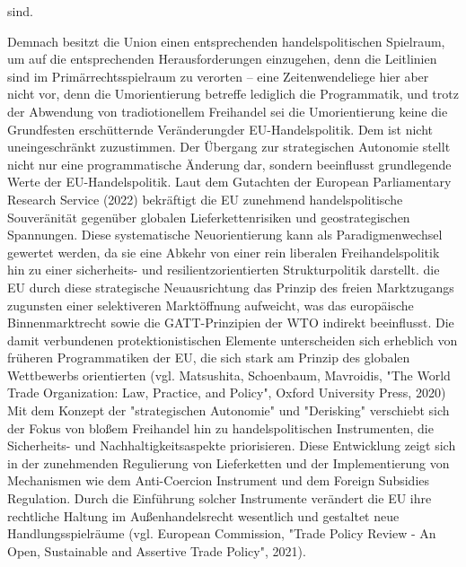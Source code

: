 \documentclass[12pt,a4paper,oneside]{book} %
\begin{document}
sind.\autocite{Callies/Ruffert, Art. 207 AEUV Rn. 76}
		
	Demnach besitzt die Union einen entsprechenden handelspolitischen Spielraum, um auf die entsprechenden Herausforderungen einzugehen, denn die Leitlinien sind im Primärrechtsspielraum zu verorten\autocite{Paschke, RdTW 2024, 206, 216} -- eine \glqq Zeitenwende\grqq liege hier aber nicht vor, denn die Umorientierung betreffe lediglich die Programmatik, und trotz der Abwendung von tradiotionellem Freihandel sei die Umorientierung \glqq keine die Grundfesten erschütternde Veränderung\grqq der EU-Handelspolitik.\autocite[So argumentieren]{Paschke, RdTW 2024, 206, 216; Müller-Ibold/Herrmann EuZW 2022, 1029} Dem ist nicht uneingeschränkt zuzustimmen.  Der Übergang zur strategischen Autonomie stellt nicht nur eine programmatische Änderung dar, sondern beeinflusst grundlegende Werte der EU-Handelspolitik. Laut dem Gutachten der European Parliamentary Research Service (2022) bekräftigt die EU zunehmend handelspolitische Souveränität gegenüber globalen Lieferkettenrisiken und geostrategischen Spannungen. Diese systematische Neuorientierung kann als Paradigmenwechsel gewertet werden, da sie eine Abkehr von einer rein liberalen Freihandelspolitik hin zu einer sicherheits- und resilientzorientierten Strukturpolitik darstellt. die EU durch diese strategische Neuausrichtung das Prinzip des freien Marktzugangs zugunsten einer selektiveren Marktöffnung aufweicht, was das europäische Binnenmarktrecht sowie die GATT-Prinzipien der WTO indirekt beeinflusst. Die damit verbundenen protektionistischen Elemente unterscheiden sich erheblich von früheren Programmatiken der EU, die sich stark am Prinzip des globalen Wettbewerbs orientierten (vgl. Matsushita, Schoenbaum, Mavroidis, "The World Trade Organization: Law, Practice, and Policy", Oxford University Press, 2020) Mit dem Konzept der "strategischen Autonomie" und "Derisking" verschiebt sich der Fokus von bloßem Freihandel hin zu handelspolitischen Instrumenten, die Sicherheits- und Nachhaltigkeitsaspekte priorisieren. Diese Entwicklung zeigt sich in der zunehmenden Regulierung von Lieferketten und der Implementierung von Mechanismen wie dem Anti-Coercion Instrument und dem Foreign Subsidies Regulation. Durch die Einführung solcher Instrumente verändert die EU ihre rechtliche Haltung im Außenhandelsrecht wesentlich und gestaltet neue Handlungsspielräume (vgl. European Commission, "Trade Policy Review - An Open, Sustainable and Assertive Trade Policy", 2021).
	
\end{document}
